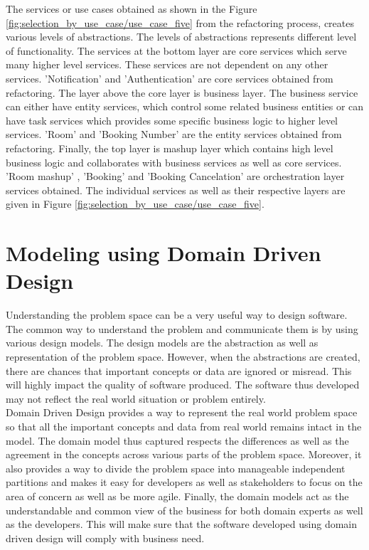 The services or use cases obtained as shown in the Figure \ref{fig:selection_by_use_case/use_case_five} from the refactoring process, creates various levels of abstractions. The levels of abstractions represents different level of functionality. The services at the bottom layer are core services which serve many higher level services. These services are not dependent on any other services. 'Notification' and 'Authentication' are core services obtained from refactoring. The layer above the core layer is business layer. The business service can either have entity services, which control some related business entities or can have task services which provides some specific business logic to higher level services. 'Room' and 'Booking Number' are the entity services obtained from refactoring. Finally, the top layer is mashup layer which contains high level business logic and collaborates with business services as well as core services. 'Room mashup' , 'Booking' and 'Booking Cancelation' are orchestration layer services obtained. The individual services as well as their respective layers are given in Figure \ref{fig:selection_by_use_case/use_case_five}. \cite{Fareghzadeh:2008aa}\cite{Emig:2015aa}\cite{Zimmermann:2005aa}

\section{Modeling using Domain Driven Design}\label{section:domain_driven_design/introduction}
Understanding the problem space can be a very useful way to design software. The common way to understand the problem and communicate them is by using various design models. The design models are the abstraction as well as representation of the problem space. However, when the abstractions are created, there are chances that important concepts or data are ignored or misread. This will highly impact the quality of software produced. The software thus developed may not reflect the real world situation or problem entirely.
\\
Domain Driven Design provides a way to represent the real world problem space so that all the important concepts and data from real world remains intact in the model. The domain model thus captured respects the differences as well as the agreement in the concepts across various parts of the problem space. Moreover, it also provides a way to divide the problem space into manageable independent partitions and makes it easy for developers as well as stakeholders to focus on the area of concern as well as be more agile. Finally, the domain models act as the understandable and common view of the business for both domain experts as well as the developers. This will make sure that the software developed using domain driven design will comply with business need.\cite{Evans:2003aa}\cite{Vernon:2013aa}
\\

